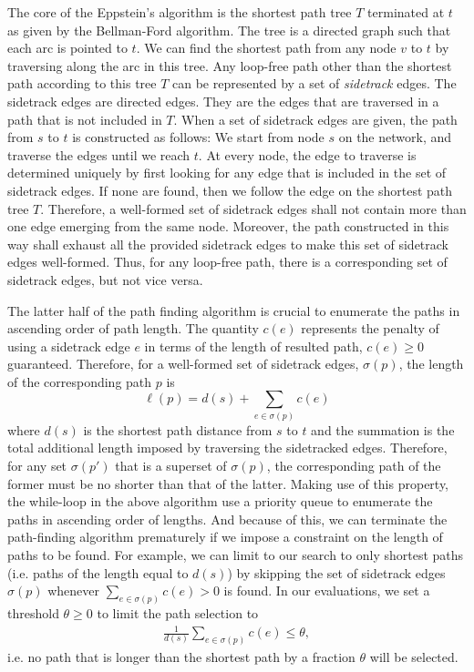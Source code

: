 \documentclass[conference]{IEEEtran}
\begin{document}
The core of the Eppstein's algorithm is the shortest path tree $T$ terminated
at $t$ as given by the Bellman-Ford algorithm. The tree is a directed graph
such that each arc is pointed to $t$. We can find the shortest path from any
node $v$ to $t$ by traversing along the arc in this tree. Any loop-free path
other than the shortest path according to this tree $T$ can be represented by a
set of \emph{sidetrack} edges. The sidetrack edges are directed edges. They are
the edges that are traversed in a path that is not included in $T$. When a set of
sidetrack edges are given, the path from $s$ to $t$ is constructed as follows:
We start from node $s$ on the network, and traverse the edges until we reach
$t$. At every node, the edge to traverse is determined uniquely by first
looking for any edge that is included in the set of sidetrack edges. If none
are found, then we follow the edge on the shortest path tree $T$. Therefore, a
well-formed set of sidetrack edges shall not contain more than one edge
emerging from the same node. Moreover, the path constructed in this way shall
exhaust all the provided sidetrack edges to make this set of sidetrack edges
well-formed. Thus, for any loop-free path, there is a corresponding set of
sidetrack edges, but not vice versa.

The latter half of the path finding algorithm is crucial to enumerate the paths
in ascending order of path length. The quantity $c(e)$ represents the penalty
of using a sidetrack edge $e$ in terms of the length of resulted path, $c(e)\ge
0$ guaranteed. Therefore, for a well-formed set of sidetrack edges,
$\sigma(p)$, the length of the corresponding path $p$ is \[
\ell(p) = d(s) + \sum_{e\in\sigma(p)} c(e) \]
where $d(s)$ is the shortest path distance from $s$ to $t$ and the summation is
the total additional length imposed by traversing the sidetracked edges.
Therefore, for any set $\sigma(p')$ that is a superset of $\sigma(p)$, the
corresponding path of the former must be no shorter than that of the latter.
Making use of this property, the while-loop in the above algorithm use a
priority queue to enumerate the paths in ascending order of lengths. And
because of this, we can terminate the path-finding algorithm prematurely if we
impose a constraint on the length of paths to be found. For example, we can
limit to our search to only shortest paths (i.e. paths of the length equal to
$d(s)$) by skipping the set of sidetrack edges $\sigma(p)$ whenever
$\sum_{e\in\sigma(p)} c(e) > 0$ is found. In our evaluations, we set a
threshold $\theta\ge 0$ to limit the path selection to
\begin{align*}
\frac{1}{d(s)}\sum_{e\in\sigma(p)}c(e) \le \theta,
\end{align*}
i.e. no path that is longer than the shortest path by a fraction $\theta$ will
be selected.
\end{document}
